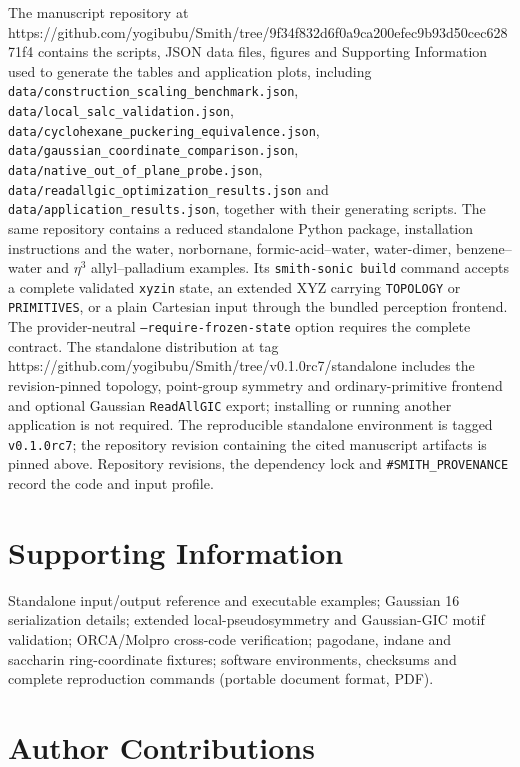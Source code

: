\documentclass[journal=jctcce,manuscript=article,layout=traditional]{achemso}
\providecommand{\url}[1]{#1}
\theoremstyle{definition}
\begin{document}
The manuscript repository at
\url{https://github.com/yogibubu/Smith/tree/9f34f832d6f0a9ca200efec9b93d50cec62871f4}
contains the scripts, JSON data files, figures and Supporting Information used
to generate the tables and application plots, including
\texttt{data/construction\_scaling\_benchmark.json},
\texttt{data/local\_salc\_validation.json},
\texttt{data/cyclohexane\_puckering\_equivalence.json},
\texttt{data/gaussian\_coordinate\_comparison.json},
\texttt{data/native\_out\_of\_plane\_probe.json},
\texttt{data/readallgic\_optimization\_results.json} and
\texttt{data/application\_results.json}, together with their generating
scripts.  The same repository contains a reduced standalone Python package,
installation instructions and the water, norbornane, formic-acid--water,
water-dimer, benzene--water and $\eta^3$ allyl--palladium examples.  Its
\texttt{smith-sonic build} command accepts a complete validated \texttt{xyzin}
state, an extended XYZ carrying \texttt{TOPOLOGY} or \texttt{PRIMITIVES}, or a
plain Cartesian input through the bundled perception frontend.  The provider-neutral
\texttt{--require-frozen-state} option requires the complete contract.  The
standalone distribution at tag
\url{https://github.com/yogibubu/Smith/tree/v0.1.0rc7/standalone} includes the revision-pinned topology, point-group
symmetry and ordinary-primitive frontend and
optional Gaussian \texttt{ReadAllGIC} export; installing or running another
application is not required.  The reproducible standalone environment is tagged
\texttt{v0.1.0rc7}; the repository revision containing the cited manuscript
artifacts is pinned above. Repository revisions, the dependency lock and
\texttt{\#SMITH\_PROVENANCE} record the code and input profile.

\section*{Supporting Information}

Standalone input/output reference and executable examples; Gaussian 16
serialization details; extended local-pseudosymmetry and Gaussian-GIC motif
validation; ORCA/Molpro cross-code verification; pagodane, indane and saccharin
ring-coordinate fixtures; software environments, checksums and complete
reproduction commands (portable document format, PDF).

\section*{Author Contributions}
\end{document}

